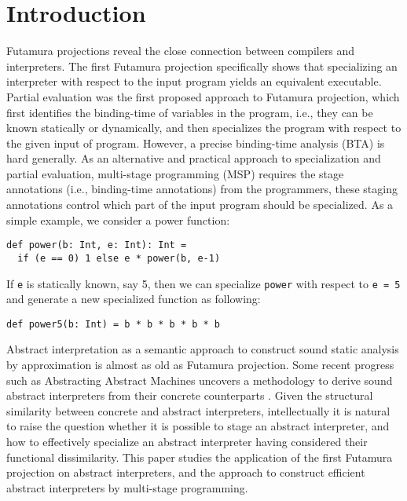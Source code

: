 \section{Introduction}


Futamura projections \cite{Futamura1999, futamura1971partial} reveal the close connection between 
compilers and interpreters. 
The first Futamura projection specifically shows that specializing an interpreter with respect to the input 
program yields an equivalent executable.
Partial evaluation \cite{DBLP:books/daglib/0072559} was the first proposed approach to Futamura projection,
which first identifies the binding-time of variables in the program, i.e., they can be known statically or dynamically, 
and then specializes the program with respect to the given input of program.
However, a precise binding-time analysis (BTA) is hard generally. As an alternative and practical approach to 
specialization and partial evaluation, multi-stage programming (MSP) \cite{taha1999multi, DBLP:conf/pepm/TahaS97} 
requires the stage annotations (i.e., binding-time annotations) from the programmers, these staging annotations 
control which part of the input program should be specialized.
As a simple example, we consider a power function: 
\begin{lstlisting}
def power(b: Int, e: Int): Int = 
  if (e == 0) 1 else e * power(b, e-1)
\end{lstlisting}
If \texttt{e} is statically known, say 5, then we can specialize \texttt{power} with respect to \texttt{e = 5} and 
generate a new specialized function as following:
\begin{lstlisting}
def power5(b: Int) = b * b * b * b * b
\end{lstlisting}

Abstract interpretation \cite{DBLP:conf/popl/CousotC77} as a semantic approach to construct sound static analysis 
by approximation is almost as old as Futamura projection.
Some recent progress such as Abstracting Abstract Machines uncovers a methodology to derive sound abstract interpreters 
from their concrete counterparts \cite{DBLP:journals/jfp/HornM12, DBLP:conf/icfp/HornM10, DBLP:journals/pacmpl/DaraisLNH17}.
Given the structural similarity between concrete and abstract interpreters, intellectually 
it is natural to raise the question whether it is possible to stage an abstract interpreter, and how 
to effectively specialize an abstract interpreter having considered their functional dissimilarity. 
This paper studies the application of the first Futamura projection on abstract interpreters, 
and the approach to construct efficient abstract interpreters by multi-stage programming.

